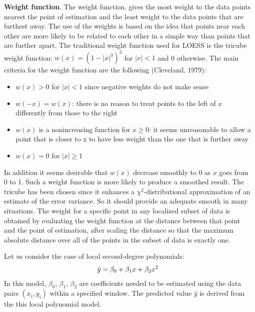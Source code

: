 \documentclass{article}
\begin{document}
\textbf{Weight function}. The weight function, gives the most weight to the data points nearest the point of estimation and the least weight to the data points that are furthest away.
The use of the weights is based on the idea that points near each other are more likely to be related to each other in a simple way than points that are further apart.
The traditional weight function used for LOESS is the tricube weight function:
$w(x) = (1 - |x|^3)^3$ for $|x| < 1$ and 0 otherwise.
The main criteria for the weight function are the following (Cleveland, 1979):
\begin{itemize}
 \item $w(x) > 0$ for $|x| < 1$ since negative weights do not make sense
 \item $w(-x) = w(x)$: there is no reason to treat points to the left of $x$ differently from those to the right 
 \item $w(x)$ is a nonincreasing function for $x \geqslant 0$: it seems unreasonable to allow a point that is closer to x to have less weight than the one that is further
   away 
  \item $w(x) = 0$ for $|x| \geqslant 1$
\end{itemize}
%
In addition it seems desirable that $w(x)$ decrease smoothly to 0 as $x$ goes from 0
to 1. Such a weight function is more likely to produce a smoothed result. The tricube has been chosen since it enhances a $\chi^2$-distributional approximation of an estimate of the error variance. So it should provide an adequate smooth in 
many situations.
The weight for a specific point in any localized subset of data is obtained by 
evaluating the weight function at the distance between that point and the point 
of estimation, after scaling the distance so that the maximum absolute distance 
over all of the points in the subset of data is exactly one. 

Let us consider the case of local second-degree polynomials:
\begin{gather}
    \hat{y} = \beta_0 + \beta_1 x + \beta_2 x^2 \notag
\end{gather}
%
In this model, $\beta_0$, $\beta_1$, $\beta_2$ are coefficients needed to be estimated using the data pairs $(x_i, y_i)$ within a specified window. The predicted value $\hat{y}$ is derived from the this local polynomial model. 
\end{document}
